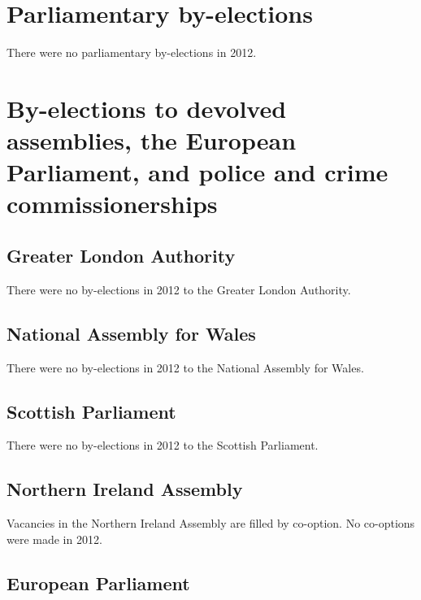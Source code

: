 \documentclass[a4paper,openany]{book}
\begin{document}
\chapter{Parliamentary by-elections}

There were no parliamentary by-elections in 2012.

\chapter{By-elections to devolved assemblies, the European Parliament, and police and crime commissionerships}

\section{Greater London Authority}

There were no by-elections in 2012 to the Greater London Authority.

\section{National Assembly for Wales}

There were no by-elections in 2012 to the National Assembly for Wales.

\section{Scottish Parliament}

There were no by-elections in 2012 to the Scottish Parliament.

\section{Northern Ireland Assembly}

Vacancies in the Northern Ireland Assembly are filled by co-option.  No co-options were made in 2012.


\section{European Parliament}
\end{document}

